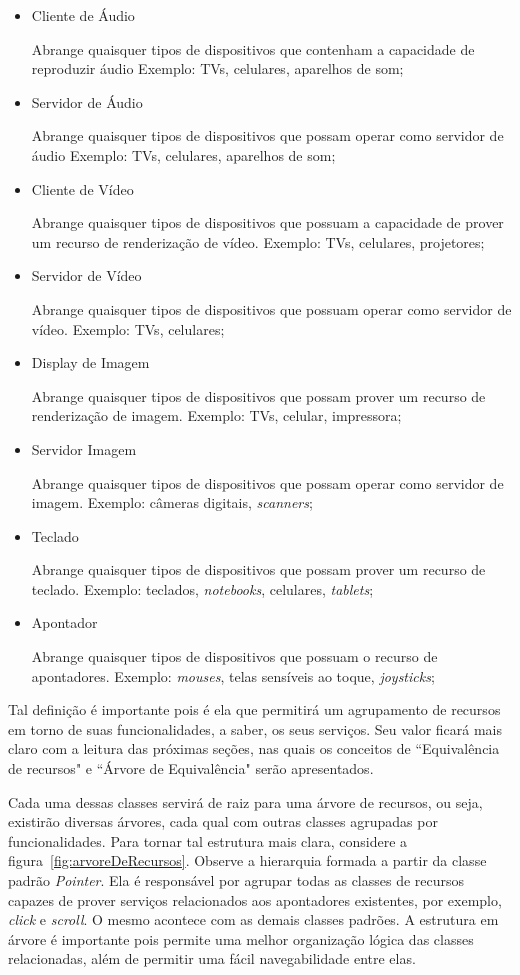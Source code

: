 \begin{itemize}
	\item Cliente de Áudio
		
		Abrange quaisquer tipos de dispositivos que contenham a capacidade de reproduzir áudio Exemplo: TVs, celulares, aparelhos de som;
	\item Servidor de Áudio
		
		Abrange quaisquer tipos de dispositivos que possam operar como servidor de áudio Exemplo: TVs, celulares, aparelhos de som;
	\item Cliente de Vídeo
		
		Abrange quaisquer tipos de dispositivos que possuam a capacidade de prover um recurso de renderização de vídeo. Exemplo: TVs, celulares, projetores;
	\item Servidor de Vídeo
		
		Abrange quaisquer tipos de dispositivos que possuam operar como servidor de vídeo. Exemplo: TVs, celulares;
	\item Display de Imagem
		
		Abrange quaisquer tipos de dispositivos que possam prover um recurso de renderização de imagem. Exemplo: TVs, celular, impressora;
	\item Servidor Imagem
		
		Abrange quaisquer tipos de dispositivos que possam operar como servidor de imagem. Exemplo: câmeras digitais, \emph{scanners};
	\item Teclado
		
		Abrange quaisquer tipos de dispositivos que possam prover um recurso de teclado. Exemplo: teclados, \emph{notebooks}, celulares, \emph{tablets};
	\item Apontador
		
		Abrange quaisquer tipos de dispositivos que possuam o recurso de apontadores. Exemplo: \emph{mouses}, telas sensíveis ao toque, \emph{joysticks};
\end{itemize}

Tal definição é importante pois é ela que permitirá um agrupamento de recursos em torno de suas funcionalidades, a saber, os seus serviços. Seu valor ficará mais claro com a leitura das próximas seções, nas quais os conceitos de ``Equivalência de recursos" e ``Árvore de Equivalência" serão apresentados.






Cada uma dessas classes servirá de raiz para uma árvore de recursos, ou seja, existirão diversas árvores, cada qual com outras classes agrupadas por funcionalidades. Para tornar tal estrutura mais clara, considere a figura~\ref{fig:arvoreDeRecursos}. Observe a hierarquia formada a partir da classe padrão \emph{Pointer}. Ela é responsável por agrupar todas as classes de recursos capazes de prover serviços relacionados aos apontadores existentes, por exemplo, \emph{click} e \emph{scroll}. O mesmo acontece com as demais classes padrões. A estrutura em árvore é importante pois permite uma melhor organização lógica das classes relacionadas, além de permitir uma fácil navegabilidade entre elas.

